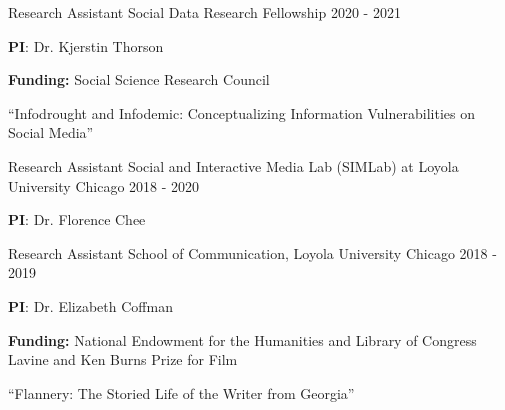 

\begin{cventries}

  \cventry
    {Research Assistant} %
    {Social Data Research Fellowship} %
    {} %
    {2020 - 2021} %
    {
      \begin{cvitems} %
              \item {\textbf{PI}: Dr. Kjerstin Thorson}
                \item {\textbf{Funding: }Social Science Research Council}
                \item {“Infodrought and Infodemic: Conceptualizing Information Vulnerabilities on Social Media”}
      \end{cvitems}
    }

    \cventry
    {Research Assistant} %
    {Social and Interactive Media Lab (SIMLab) at Loyola University Chicago} %
    {} %
    {2018 - 2020} %
    {
      \begin{cvitems} %
        \item {\textbf{PI}: Dr. Florence Chee}
      \end{cvitems}
    }
    
    \cventry
    {Research Assistant} %
    {School of Communication, Loyola University Chicago} %
    {} %
    {2018 - 2019} %
    {
      \begin{cvitems} %
              \item {\textbf{PI}: Dr. Elizabeth Coffman}
                \item {\textbf{Funding: }National Endowment for the Humanities and Library of Congress Lavine and Ken Burns Prize for Film}
                \item {“Flannery: The Storied Life of the Writer from Georgia”}
      \end{cvitems}
    }

\end{cventries}






